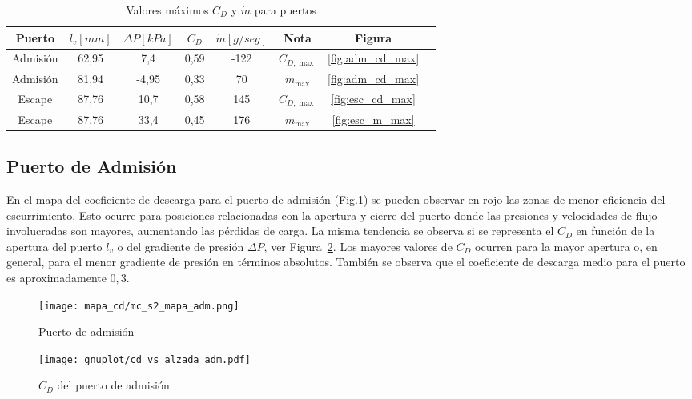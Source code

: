 \begin{table}[h!]
  \centering
  \begin{tabular}{cccccccc}\toprule
    Puerto   & $l_{v} [mm]$ & $\Delta P [kPa]$ & $C_{D}$ & $\dot{m} [g/seg]$ & Nota            & Figura\\ \midrule
    Admisión & 62,95        &  7,4            & 0,59   & -122              & $C_{D,\max}$     &\ref{fig:adm_cd_max} \\
    Admisión & 81,94        &  -4,95           & 0,33   &   70              & $\dot{m}_{\max}$ &\ref{fig:adm_cd_max} \\
    Escape   & 87,76        & 10,7            & 0,58   &  145              & $C_{D,\max}$     &\ref{fig:esc_cd_max}\\
    Escape   & 87,76        & 33,4            & 0,45   &  176              & $\dot{m}_{\max}$ &\ref{fig:esc_m_max}\\
  \end{tabular}
  \caption{Valores máximos $C_{D}$ y $\dot{m}$ para puertos}\label{tab:resumen_puertos}
\end{table}


\subsection{Puerto de Admisión}
%
En el mapa del coeficiente de descarga  para el puerto de admisión
(Fig.\ref{fig:mapa_cd_admision}) se pueden observar en rojo las zonas de menor
eficiencia del escurrimiento.
%
Esto ocurre para posiciones relacionadas con la apertura y cierre del puerto
donde las presiones y velocidades de flujo involucradas son mayores, aumentando
las pérdidas de carga.
%
La misma tendencia se observa si se representa el $C_{D}$ en función de la
apertura del puerto $l_{v}$ o del gradiente de presión $\Delta P$, ver
Figura~\ref{fig:cd_admision}.
%
Los mayores valores de $C_{D}$ ocurren para la mayor apertura o, en general,
para el menor gradiente de presión en términos absolutos.
%
También se observa que el coeficiente de descarga medio para el puerto es
aproximadamente $0,3$.

\begin{figure}[h!]
    \centering
    \texttt{[image: mapa\_cd/mc\_s2\_mapa\_adm.png]}
    \caption{Puerto de admisión}\label{fig:mapa_cd_admision}
\end{figure}

\begin{figure}[h!]
    \centering
    \texttt{[image: gnuplot/cd\_vs\_alzada\_adm.pdf]}
    \caption{$C_{D}$ del puerto de admisión}\label{fig:cd_admision}
\end{figure}


